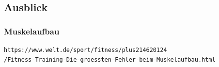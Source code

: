 \documentclass[10pt,a4paper]{article}
\begin{document}




\subsection{Ausblick}

\subsubsection{Muskelaufbau}

\verb+https://www.welt.de/sport/fitness/plus214620124+ \\
\verb+/Fitness-Training-Die-groessten-Fehler-beim-Muskelaufbau.html+

\end{document}
